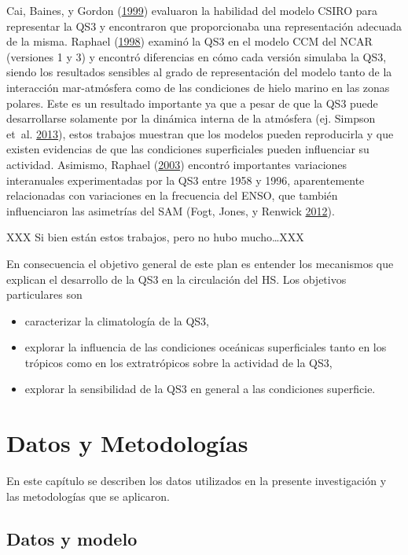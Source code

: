 \documentclass[spanish,a4paper,12p]{book}
\providecommand{\tightlist}{%
  \setlength{\itemsep}{0pt}\setlength{\parskip}{0pt}}
\begin{document}
Cai, Baines, y Gordon (\protect\hyperlink{ref-Cai1999}{1999}) evaluaron
la habilidad del modelo CSIRO para representar la QS3 y encontraron que
proporcionaba una representación adecuada de la misma. Raphael
(\protect\hyperlink{ref-Raphael1998}{1998}) examinó la QS3 en el modelo
CCM del NCAR (versiones 1 y 3) y encontró diferencias en cómo cada
versión simulaba la QS3, siendo los resultados sensibles al grado de
representación del modelo tanto de la interacción mar-atmósfera como de
las condiciones de hielo marino en las zonas polares. Este es un
resultado importante ya que a pesar de que la QS3 puede desarrollarse
solamente por la dinámica interna de la atmósfera (ej. Simpson et~al.
\protect\hyperlink{ref-Simpson2013}{2013}), estos trabajos muestran que
los modelos pueden reproducirla y que existen evidencias de que las
condiciones superficiales pueden influenciar su actividad. Asimismo,
Raphael (\protect\hyperlink{ref-Raphael2003}{2003}) encontró importantes
variaciones interanuales experimentadas por la QS3 entre 1958 y 1996,
aparentemente relacionadas con variaciones en la frecuencia del ENSO,
que también influenciaron las asimetrías del SAM (Fogt, Jones, y Renwick
\protect\hyperlink{ref-Fogt2012}{2012}).

XXX Si bien están estos trabajos, pero no hubo mucho\ldots{}XXX

En consecuencia el objetivo general de este plan es entender los
mecanismos que explican el desarrollo de la QS3 en la circulación del
HS. Los objetivos particulares son

\begin{itemize}
\tightlist
\item
  caracterizar la climatología de la QS3,
\item
  explorar la influencia de las condiciones oceánicas superficiales
  tanto en los trópicos como en los extratrópicos sobre la actividad de
  la QS3,
\item
  explorar la sensibilidad de la QS3 en general a las condiciones
  superficie.
\end{itemize}

\chapter{Datos y Metodologías}\label{datos-y-metodologias}

En este capítulo se describen los datos utilizados en la presente
investigación y las metodologías que se aplicaron.

\section{Datos y modelo}\label{datos-y-modelo}
\end{document}
